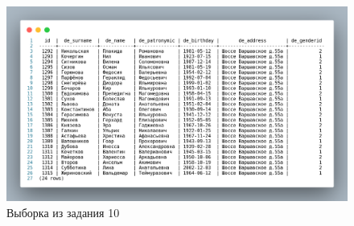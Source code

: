 \begin{figure}[!h]
  \centering

  \includegraphics[width=16cm]
  {../sql/task10/10-out.png}

  \caption{Выборка из задания 10}

  \label{fig:t10}
\end{figure}

\newpage












\newpage
